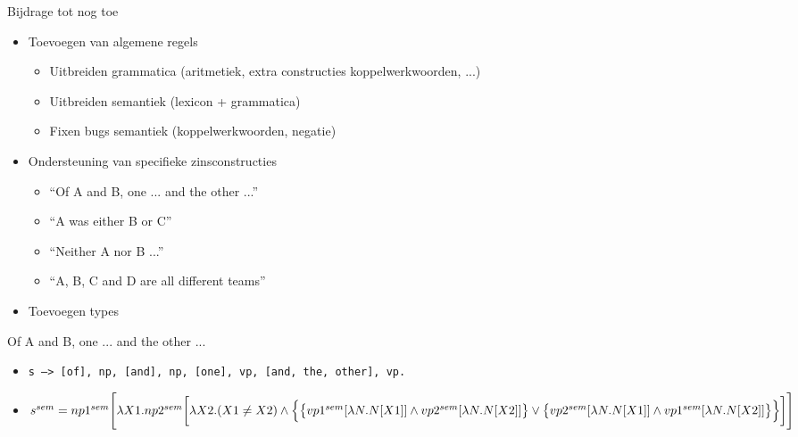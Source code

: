 \documentclass[notes, dvipsnames]{beamer}
\newcommand{\hitem}{
	\ppause
	\item
}
\newcommand{\ppause}{\onslide<+>}
\begin{document}
	\begin{frame}{Bijdrage tot nog toe}
    \begin{itemize}
      \hitem Toevoegen van algemene regels
        \begin{itemize}
          \item Uitbreiden grammatica (aritmetiek, extra constructies koppelwerkwoorden, ...)
          \item Uitbreiden semantiek (lexicon + grammatica)
          \item Fixen bugs semantiek (koppelwerkwoorden, negatie)
        \end{itemize}
      \hitem Ondersteuning van specifieke zinsconstructies
        \begin{itemize}
          \item ``Of A and B, one ... and the other ...''
          \item ``A was either B or C''
          \item ``Neither A nor B ...''
          \item ``A, B, C and D are all different teams''
        \end{itemize}
      \hitem Toevoegen types
    \end{itemize}
	\end{frame}

	\begin{frame}{Of A and B, one ... and the other ...}
    \begin{itemize}
      \hitem \texttt{s --> [of], np, [and], np, [one], vp, [and, the, other], vp.}
      \hitem $s^{sem} = np1^{sem}\Bigg[\lambda X1. np2^{sem}\bigg[\lambda X2. \\
      (X1 \neq X2) \land \Big\{\big\{vp1^{sem}[\lambda N.N[X1]] \land vp2^{sem}[\lambda N.N[X2]]\big\} \lor \big\{vp2^{sem}[\lambda N.N[X1]] \land vp1^{sem}[\lambda N.N[X2]]\big\} \Big\}\bigg]\Bigg]$
    \end{itemize}
	\end{frame}
\end{document}
